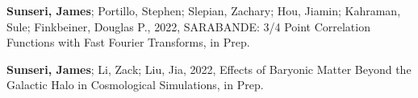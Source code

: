 \item \textbf{Sunseri, James}; Portillo, Stephen; Slepian, Zachary; Hou, Jiamin; Kahraman, Sule; Finkbeiner, Douglas P., 2022, {SARABANDE: 3/4 Point Correlation Functions with Fast Fourier Transforms}, in Prep.

\item \textbf{Sunseri, James}; Li, Zack; Liu, Jia, 2022, {Effects of Baryonic Matter Beyond the Galactic Halo in Cosmological Simulations}, in Prep.